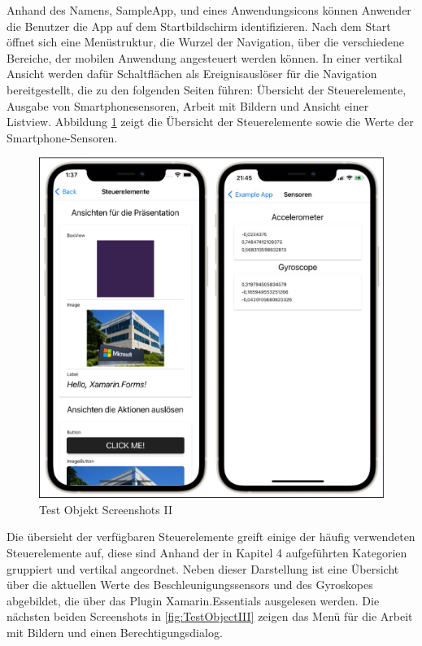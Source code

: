 Anhand des Namens,  SampleApp,  und eines Anwendungsicons können Anwender die Benutzer die App auf dem Startbildschirm identifizieren.  Nach dem Start öffnet sich eine Menüstruktur,  die Wurzel der Navigation, über die verschiedene Bereiche, der mobilen Anwendung angesteuert werden können.  In einer vertikal Ansicht werden dafür Schaltflächen als Ereignisauslöser für die Navigation bereitgestellt,  die zu den folgenden Seiten führen: Übersicht der Steuerelemente,  Ausgabe von Smartphonesensoren,  Arbeit mit Bildern und Ansicht einer Listview.   Abbildung \ref{fig:TestObjectII} zeigt die Übersicht der Steuerelemente sowie die Werte der Smartphone-Sensoren.

\begin{figure}[!ht]
 \includegraphics[width=\textwidth,keepaspectratio]{Images/Screenshot/Sensors.png}
 \caption{Test Objekt Screenshots II}
 \label{fig:TestObjectII}
\end{figure}
Die übersieht der verfügbaren Steuerelemente greift einige der häufig verwendeten Steuerelemente auf,  diese sind Anhand der in Kapitel 4 aufgeführten Kategorien gruppiert und vertikal angeordnet.  Neben dieser Darstellung ist eine Übersicht über die aktuellen Werte des Beschleunigungssensors und des Gyroskopes abgebildet,  die über das Plugin Xamarin.Essentials ausgelesen werden.  Die nächsten beiden Screenshots in \ref{fig:TestObjectIII} zeigen das Menü für die Arbeit mit Bildern und einen Berechtigungsdialog.

